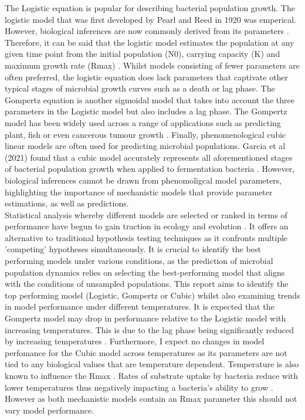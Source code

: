 \documentclass[11pt]{article}
\begin{document}
The Logistic equation is popular for describing bacterial population growth. The logistic model that was first developed by Pearl and Reed in 1920 was emperical. However, biological inferences are now commonly derived from its parameters \cite{WACHENHEIM2003157} \cite{Pearl1920}. Therefore, it can be said that the logistic model estimates the population at any given time point from the initial population (N0), carrying capacity (K) and maximum growth rate (Rmax) \cite{WACHENHEIM2003157}. Whilst models consisting of fewer parameters are often preferred, the logistic equation does lack parameters that captivate other typical stages of microbial growth curves such as a death or lag phase. The Gompertz equation is another sigmoidal model that takes into account the three parameters in the Logistic model but also includes a lag phase. The Gompertz model has been widely used across a range of applications such as predicting plant, fish or even cancerous tumour growth \cite{Tjrve2017}. Finally, phenomenological cubic linear models are often used for predicting microbial populations. Garcia et al (2021) found that a cubic model accurately represents all aforementioned stages of bacterial population growth when applied to fermentation bacteria \cite{Garcia2021}. However, biological inferences cannot be drawn from phenomoligcal model parameters, highlighting the importance of mechanistic models that provide parameter estimations, as well as predictions.\\

Statistical analysis whereby different models are selected or ranked in terms of performance have begun to gain traction in ecology and evolution \cite{JOHNSON2004101}. It offers an alternative to traditional hypothesis testing techniques as it confronts multiple 'competing' hypotheses simultaneously. It is crucial to identify the best performing models under various conditions, as the prediction of microbial population dynamics relies on selecting the best-performing model that aligns with the conditions of unsampled populations. This report aims to identify the top performing model (Logistic, Gompertz or Cubic) whilst also examining trends in model performance under different temperatures. It is expected that the Gompertz model may drop in performance relative to the Logistic model with increasing temperatures. This is due to the lag phase being significantly reduced by increasing temperatures \cite{ABA2021109108}. Furthermore, I expect no changes in model perfomance for the Cubic model across temperatures as its parameters are not tied to any biological values that are temperature dependent. Temperature is also known to influence the Rmax\cite{Ward1972} \cite{Dey2020}. Rates of substrate uptake by bacteria reduce with lower temperatures thus negatively impacting a bacteria's ability to grow \cite{Nedwell1994}. However as both mechanistic models contain an Rmax parameter this should not vary model performance.\\
\end{document}
